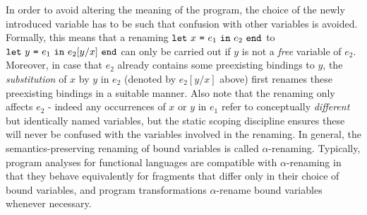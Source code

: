In order to avoid altering the meaning of the program, the choice of
the newly introduced variable has to be such that confusion with other
variables is avoided. Formally, this means that a renaming $\texttt{let}\ {x}\ \texttt{=}\ {e_1}\ \texttt{in}\ {e_2}\ \texttt{end}$ to $\texttt{let}\ {y}\ \texttt{=}\ {e_1}\ \texttt{in}\ {e_2[y/x]}\ \texttt{end}$ can only be carried out if
$y$ is not a \emph{free} variable of $e_2$. Moreover, in case that
$e_2$ already contains some preexisting bindings to $y$, the
\emph{substitution} of $x$ by $y$ in $e_2$ (denoted by $e_2[y/x]$
above) first renames these preexisting bindings in a suitable manner.
Also note that the renaming only affects $e_2$ - indeed any
occurrences of $x$ or $y$ in $e_1$ refer to conceptually
\emph{different} but identically named variables, but the static
scoping discipline ensures these will never be confused with the
variables involved in the renaming.
%
%
In general, the semantics-preserving renaming of bound variables is
called $\alpha$-renaming. Typically, program analyses for functional
languages are compatible with $\alpha$-renaming in that they behave
equivalently for fragments that differ only in their choice of bound
variables, and program transformations $\alpha$-rename bound variables
whenever necessary.

